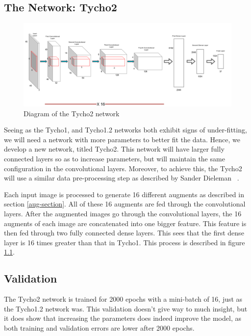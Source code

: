 \documentclass[12pt,a4paper,oneside,oldfontcommands]{memoir}
\begin{document}
\begin{Declaration Of OriginalityOrginality}
\chapter{The Network: Tycho2} \label{tycho2}


\begin{figure}[H]
  \centering
    \includegraphics[width=\linewidth]{images/Tycho2.png}
    \caption{Diagram of the Tycho2 network}
   \label{fig:tycho-2-diagram}
\end{figure}

Seeing as the Tycho1, and Tycho1.2 networks both exhibit signs of under-fitting, we will need a network with more parameters to better fit the data. Hence, we develop a new network, titled Tycho2. This network will have larger fully connected layers so as to increase parameters, but will maintain the same configuration in the convolutional layers. Moreover, to achieve this, the Tycho2 will use a similar data pre-processing step as described by Sander Dieleman ~\cite{Sanders-GZ}.

Each input image is processed to generate 16 different augments as described in section \ref{aug-section}. All of these 16 augments are fed through the convolutional layers. After the augmented images go through the convolutional layers, the 16 augments of each image are concatenated into one bigger feature. This feature is then fed through two fully connected dense layers. This sees that the first dense layer is 16 times greater than that in Tycho1. This process is described in figure \ref{fig:tycho-2-diagram}.

\section{Validation}

The Tycho2 network is trained for 2000 epochs with a mini-batch of 16, just as the Tycho1.2 network was. This validation doesn't give way to much insight, but it does show that increasing the parameters does indeed improve the model, as both training and validation errors are lower after 2000 epochs.



\end{Declaration Of OriginalityOrginality}
\end{document}
